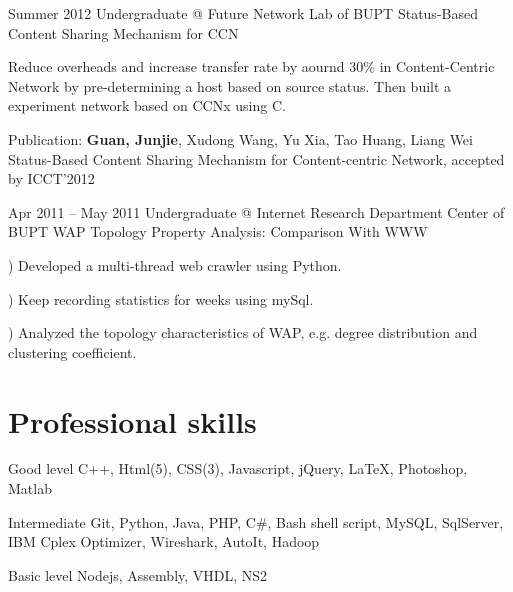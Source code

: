 \documentclass{tccv}
\begin{document}
\begin{eventlist}

\item{Summer 2012}
     {Undergraduate @ Future Network Lab of BUPT}
     {Status-Based Content Sharing Mechanism for CCN}
     
	Reduce overheads and increase transfer rate by aournd 30\% in Content-Centric Network by pre-determining a host based on source status. Then built a experiment network based on CCNx using C. 

Publication: \textbf{Guan, Junjie}, Xudong Wang, Yu Xia, Tao Huang, Liang Wei Status-Based Content Sharing Mechanism for Content-centric Network, accepted by ICCT’2012

\item{Apr 2011 -- May 2011}
     {Undergraduate @ Internet Research Department Center of BUPT}
     {WAP Topology Property Analysis: Comparison With WWW}     
     
) Developed a multi-thread web crawler using Python. 

) Keep recording statistics for weeks using mySql. 

) Analyzed the topology characteristics of WAP, e.g. degree distribution and clustering coefficient.\newline

\end{eventlist}






















\if
\section{Professional skills}

\begin{factlist}

\item{Good level}
     {C++, Html(5), CSS(3), Javascript, jQuery, \LaTeX, Photoshop, Matlab}

\item{Intermediate}
     {Git, Python, Java, PHP, C\#, Bash shell script, MySQL, SqlServer, IBM Cplex Optimizer, Wireshark, AutoIt, Hadoop}

\item{Basic level}
     {Nodejs, Assembly, VHDL, NS2}

\end{factlist}

\fi
\end{document}
